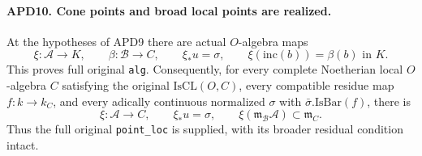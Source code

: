 \documentclass[11pt,a4paper]{article}
\numberwithin{equation}{section}
\theoremstyle{remark}\newtheorem{remark}[theorem]{Remark}
\begin{document}
\paragraph{APD10. Cone points and broad local points are realized.}
\label{claim:APD10}
At the hypotheses of APD9 there are actual \(O\)-algebra maps
\[
 \xi:\mathcal A\longrightarrow K,
 \qquad\beta:\mathcal B\longrightarrow C,
 \qquad \xi_*u=\sigma,\qquad
 \xi(\mathrm{inc}(b))=\beta(b)\text{ in }K.                \tag{APD.20}
\]
This proves full original \texttt{alg}.  Consequently, for every
complete Noetherian local \(O\)-algebra \(C\) satisfying the
original \(\mathrm{IsCL}(O,C)\), every compatible residue map
\(f:k\to k_C\), and every adically continuous normalized
\(\sigma\) with \(\bar\sigma.\mathrm{IsBar}(f)\), there is
\[
 \xi:\mathcal A\longrightarrow C,
 \qquad \xi_*u=\sigma,
 \qquad \xi(\mathfrak m_{\mathcal B}\mathcal A)
                                  \subset\mathfrak m_C. \tag{APD.21}
\]
Thus the full original \texttt{point\_\allowbreak loc} is supplied, with its
broader residual condition intact.
\end{document}

